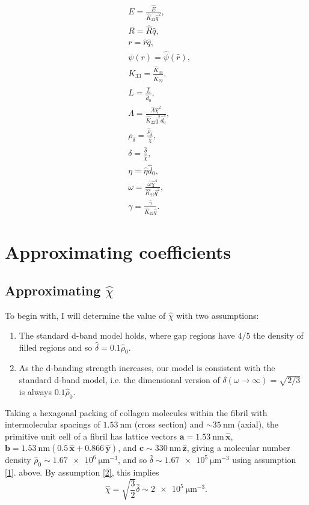 \documentclass[12pt]{article}
\begin{document}
\begin{align}
&E=\frac{\hat{E}}{\hat{K}_{22}\hat{q}^2},\\
&R=\hat{R}\hat{q},\\
&r=\hat{r}\hat{q},\\
&\psi(r)=\hat{\psi}(\hat{r}),\\
&K_{33}=\frac{\hat{K}_{33}}{\hat{K}_{22}},\\
&L=\frac{\hat{L}}{\hat{d}_0},\\
&\Lambda=\frac{\hat{\Lambda}\hat{\chi}^2}{\hat{K}_{22}\hat{q}^2\hat{d}_0^4},\label{eq:dimensionlessLambda}\\
&\rho_{\delta}=\frac{\hat{\rho}_{\delta}}{\hat{\chi}},\\
&\delta=\frac{\hat{\delta}}{\hat{\chi}},\\
&\eta=\hat{\eta}\hat{d}_0,\\
&\omega=\frac{\hat{\omega}\hat{\chi}^4}{\hat{K}_{22}\hat{q}^2},\label{eq:dimensionlessomega}\\
&\gamma=\frac{\hat{\gamma}}{\hat{K}_{22}\hat{q}}.
\end{align}
\section{Approximating coefficients}
\subsection{Approximating $\hat{\chi}$}
To begin with, I will determine the value of $\hat{\chi}$ with two assumptions: 
\begin{enumerate}
\item \label{1} The standard d-band model holds, where gap regions have $4/5$ the density of filled regions and so $\hat{\delta}=0.1\hat{\rho}_0$.
\item \label{2} As the d-banding strength increases, our model is consistent with the standard d-band model, i.e. the dimensional version of $\delta(\omega\to\infty)=\sqrt{2/3}$ is always $0.1\hat{\rho}_0$.
\end{enumerate}
Taking a hexagonal packing of collagen molecules within the fibril with intermolecular spacings of $\SI{1.53}{\nano\meter}$ (cross section) and $\sim\SI{35}{\nano\meter}$ (axial), the primitive unit cell of a fibril has lattice vectors $\bm{a}=\SI{1.53}{\nano\meter}\,\hat{\bm{x}}$, $\bm{b}=\SI{1.53}{\nano\meter}(0.5\,\hat{\bm{x}}+0.866\,\hat{\bm{y}})$, and $\bm{c}\sim\SI{330}{\nano\meter}\,\hat{\bm{z}}$, giving a molecular number density $\hat{\rho}_0\sim\SI{1.67e6}{\micro\meter^{-3}}$, and so $\hat{\delta}\sim\SI{1.67e5}{\micro\meter^{-3}}$ using assumption \ref{1}. above. By assumption \ref{2}, this implies
\begin{equation}\label{eq:chi}
\hat{\chi}=\sqrt{\frac{3}{2}}\hat{\delta}\sim\SI{2e5}{\micro\meter^{-3}}.
\end{equation}
\end{document}
